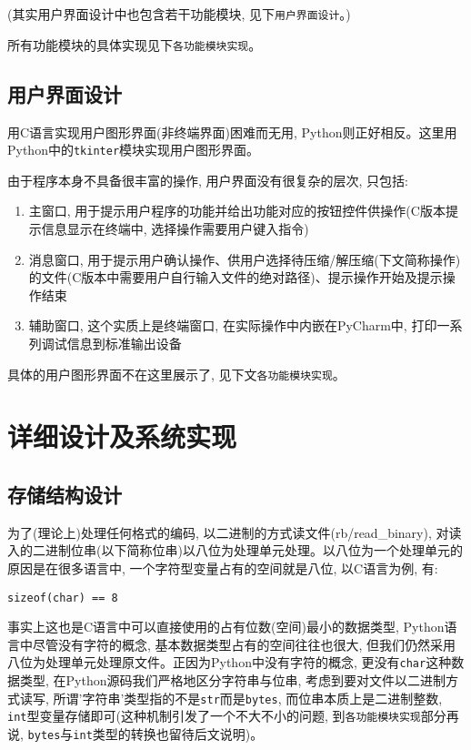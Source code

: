 \documentclass[a4paper]{ctexart}
\begin{document}
(其实用户界面设计中也包含若干功能模块, 见下\texttt{用户界面设计}。)

所有功能模块的具体实现见下\texttt{各功能模块实现}。

\subsection{用户界面设计}\label{header-n123}

用C语言实现用户图形界面(非终端界面)困难而无用, Python则正好相反。这里用Python中的\texttt{tkinter}模块实现用户图形界面。

由于程序本身不具备很丰富的操作, 用户界面没有很复杂的层次, 只包括:

\begin{enumerate}
\def\labelenumi{\arabic{enumi}.}
\item
  主窗口, 用于提示用户程序的功能并给出功能对应的按钮控件供操作(C版本提示信息显示在终端中, 选择操作需要用户键入指令)
\item
  消息窗口, 用于提示用户确认操作、供用户选择待压缩/解压缩(下文简称操作)的文件(C版本中需要用户自行输入文件的绝对路径)、提示操作开始及提示操作结束
\item
  辅助窗口, 这个实质上是终端窗口, 在实际操作中内嵌在PyCharm中, 打印一系列调试信息到标准输出设备
\end{enumerate}

具体的用户图形界面不在这里展示了, 见下文\texttt{各功能模块实现}。


\section{详细设计及系统实现}\label{header-n134}

\subsection{存储结构设计}\label{header-n135}

为了(理论上)处理任何格式的编码, 以二进制的方式读文件(rb/read\_binary), 对读入的二进制位串(以下简称位串)以八位为处理单元处理。以八位为一个处理单元的原因是在很多语言中, 一个字符型变量占有的空间就是八位, 以C语言为例, 有:

{\setmainfont{Courier New Bold}              
\begin{lstlisting}
sizeof(char) == 8
\end{lstlisting}}

事实上这也是C语言中可以直接使用的占有位数(空间)最小的数据类型, Python语言中尽管没有字符的概念, 基本数据类型占有的空间往往也很大, 但我们仍然采用八位为处理单元处理原文件。正因为Python中没有字符的概念, 更没有\texttt{char}这种数据类型, 在Python源码我们严格地区分字符串与位串, 考虑到要对文件以二进制方式读写, 所谓'字符串'类型指的不是\texttt{str}而是\texttt{bytes}, 而位串本质上是二进制整数,  \texttt{int}型变量存储即可(这种机制引发了一个不大不小的问题, 到\texttt{各功能模块实现}部分再说, \texttt{bytes}与\texttt{int}类型的转换也留待后文说明)。
\end{document}
